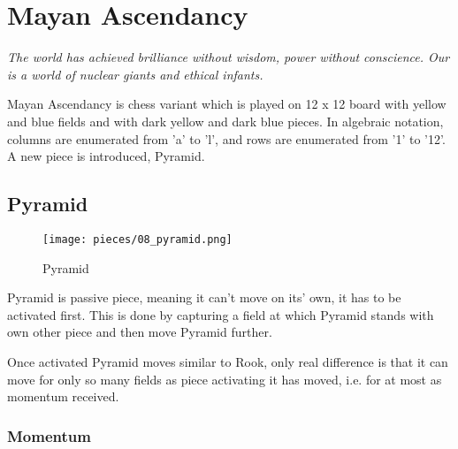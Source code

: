 
\chapter*{Mayan Ascendancy}

\begin{flushright}
\parbox{0.8\textwidth}{
\emph{The world has achieved brilliance without wisdom, power without
conscience. Our is a world of nuclear giants and ethical infants. \\
 } }
\end{flushright}

\noindent
Mayan Ascendancy is chess variant which is played on 12 x 12 board with
yellow and blue fields and with dark yellow and dark blue pieces. In
algebraic notation, columns are enumerated from 'a' to 'l', and rows are
enumerated from '1' to '12'. A new piece is introduced, Pyramid.

\clearpage %

\section*{Pyramid}

\noindent
\begin{wrapfigure}[12]{l}{0.4\textwidth}
\texttt{[image: pieces/08\_pyramid.png]}
\caption{Pyramid}
\label{fig:08_pyramid}
\end{wrapfigure}
Pyramid is passive piece, meaning it can't move on its' own, it has to be
activated first. This is done by capturing a field at which Pyramid stands
with own other piece and then move Pyramid further.

Once activated Pyramid moves similar to Rook, only real difference is that
it can move for only so many fields as piece activating it has moved, i.e.
for at most as momentum received.

\subsection*{Momentum}


